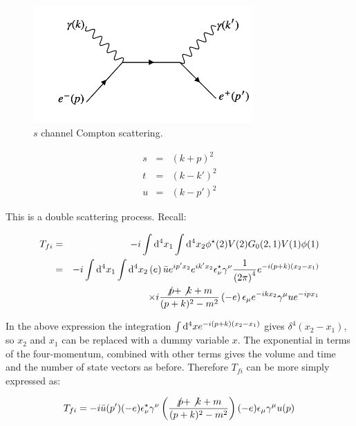 \begin{figure}[!htb]
  \begin{center}
    \includegraphics[width=0.75\textwidth]{images/web_feynman/image_40.png}
    \caption[$s$ channel Compton scattering]{$s$ channel Compton scattering.}
    \label{fig:ch11_ComptonSChannel}
  \end{center}
\end{figure}

\begin{eqnarray*}
  s & = & (k + p)^2  \\
  t & = & (k - k')^2 \\
  u & = & (k - p')^2
\end{eqnarray*}

This is a double scattering process.  Recall:

\begin{eqnarray*}
  T_{fi} & = & -i\int\mathrm{d}^4x_1\int\mathrm{d}^4x_2\phi^{\star}(2)V(2)G_0(2,1)V(1)\phi(1) \\
  & = & -i\int\mathrm{d}^4x_1\int\mathrm{d}^4x_2\left(e\right)\bar{u}e^{ip'x_2}e^{ik'x_2}\epsilon^{\star}_{\nu}\gamma^{\nu}\frac{1}{\left(2\pi\right)^4}e^{-i(p + k)(x_2 - x_1)}\\
  &   & \times i\frac{\not{p} + \not{k} + m}{(p + k)^2 - m^2}\left(-e\right)\epsilon_{\mu}e^{-ikx_2}\gamma^{\mu}ue^{-ipx_1}
\end{eqnarray*}

In the above expression the integration $\int\mathrm{d}^4xe^{-i(p + k)(x_2 - x_1)}$ gives $\delta^4(x_2 - x_1)$, so $x_2$ and $x_1$ can be replaced with a dummy variable $x$.  The exponential in terms of the four-momentum, combined with other terms gives the volume and time and the number of state vectors as before.  Therefore $T_{fi}$ can be more simply expressed as:

\[
  T_{fi} = -i\bar{u}(p')(-e)\epsilon^{\star}_{\nu}\gamma^{\nu}
           \left(\frac{\not{p} + \not{k} + m}{(p + k)^2 - m^2}\right)
           (-e)\epsilon_{\mu}\gamma^{\mu}u(p)
\]

